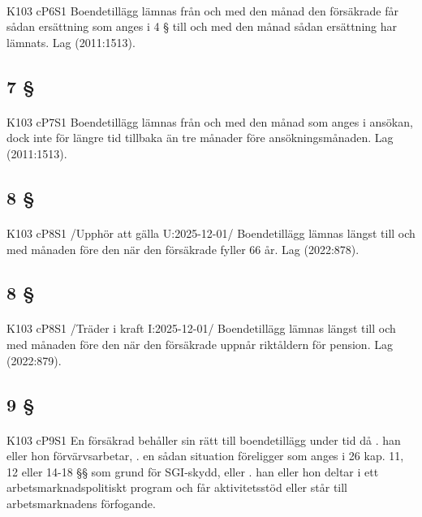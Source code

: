 \documentclass[a4paper,notitlepage,openany,10pt]{book}
\begin{document}
\paragraph*{}
{\tiny K103 cP6S1}
Boendetillägg lämnas från och med den månad den försäkrade får sådan ersättning som anges i 4 § till och med den månad sådan ersättning har lämnats.
Lag (2011:1513).
\subsection*{7 §}
\paragraph*{}
{\tiny K103 cP7S1}
Boendetillägg lämnas från och med den månad som anges i ansökan, dock inte för längre tid tillbaka än tre månader före ansökningsmånaden.
Lag (2011:1513).
\subsection*{8 §}
\paragraph*{}
{\tiny K103 cP8S1}
/Upphör att gälla U:2025-12-01/
Boendetillägg lämnas längst till och med månaden före den när den försäkrade fyller 66 år.
Lag (2022:878).
\subsection*{8 §}
\paragraph*{}
{\tiny K103 cP8S1}
/Träder i kraft I:2025-12-01/
Boendetillägg lämnas längst till och med månaden före den när den försäkrade uppnår riktåldern för pension.
Lag (2022:879).
\subsection*{9 §}
\paragraph*{}
{\tiny K103 cP9S1}
En försäkrad behåller sin rätt till boendetillägg under tid då
. han eller hon förvärvsarbetar,
. en sådan situation föreligger som anges i 26 kap. 11, 12 eller 14-18 §§ som grund för SGI-skydd, eller
. han eller hon deltar i ett arbetsmarknadspolitiskt program och får aktivitetsstöd eller står till arbetsmarknadens förfogande.
\end{document}
